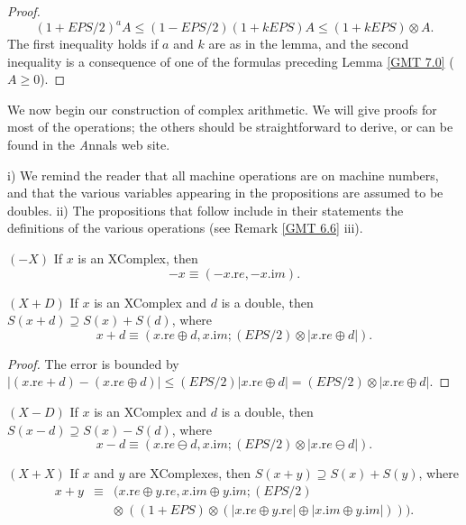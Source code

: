 \begin{proof}{} 
$$(1 + EPS/2)^a A\le (1 - EPS/2)(1 + k EPS) A \le (1 + k EPS) \otimes A.$$ 
The first inequality holds if $a$ and $k$ are as in the lemma, and the second inequality is a consequence of one of the
formulas preceding Lemma \ref{GMT 7.0} ($A \ge 0$). \end{proof}
 
We now begin our construction of complex arithmetic. We will give proofs for most of the operations; the others should be straightforward to derive,
or can be found in the {\textit Annals} web site.
\begin{remarks} \label{GMT 7.5}
i) We remind the reader that all machine operations are on machine numbers, and that the various variables appearing in the propositions are assumed to be doubles.
ii) The propositions that follow include in their statements the definitions of the various operations (see Remark \ref{GMT 6.6} iii).\end{remarks}

\begin{proposition}\label{GMT prop7.1}{$(-X)$}
If $x$ is an {\textrm XComplex,} then 
$$-x \equiv (-x.{\mathrm re},-x.{\mathrm im}).$$ 
\end{proposition}

\begin{proposition}\label{GMT prop7.2}{$(X + D)$} 
If $x$ is an {\textrm XComplex} and $d$ is a double{\textrm ,} then 
$S(x + d) \supseteq S(x) + S(d)${\textrm ,} where 
 $$x + d \equiv (x.{\mathrm re} \oplus d, x.{\mathrm im};
(EPS/2)\otimes |x.{\mathrm re} \oplus d|).$$
\end{proposition}

\begin{proof}{}
The  error is bounded by  
\hfill ${\displaystyle |(x.{\mathrm re} + d) - (x.{\mathrm re} \oplus d)|
\le (EPS/2) | x.{\mathrm re} \oplus d|
  =  (EPS/2) \otimes | x.{\mathrm re} \oplus d|.}$ \end{proof}

\begin{proposition}\label{GMT prop7.3}{$(X - D)$}
If $x$ is an {\textrm XComplex} and $d$ is a double{\textrm ,} then 
$S(x - d) \supseteq S(x) - S(d)${\textrm ,} where 
 $$x - d \equiv (x.{\mathrm re} \ominus d, x.{\mathrm im};
(EPS/2)\otimes |x.{\mathrm re} \ominus d|).$$ \end{proposition}

\begin{proposition}\label{GMT prop7.4}{$(X + X)$}
If $x$ and $y$ are {\textrm XComplexes,} then 
$S(x + y) \supseteq S(x) + S(y)${\textrm ,} where
 \begin{eqnarray*}
x + y &\equiv& (x.{\mathrm re} \oplus y.{\mathrm re}, x.{\mathrm im} \oplus y.{\mathrm im};
(EPS/2)\\
&&  \otimes\ ((1 + EPS)  \otimes (|x.{\mathrm re} \oplus y.{\mathrm re}| \oplus |x.{\mathrm im} \oplus y.{\mathrm im}|))).
\end{eqnarray*}
\end{proposition}
  

